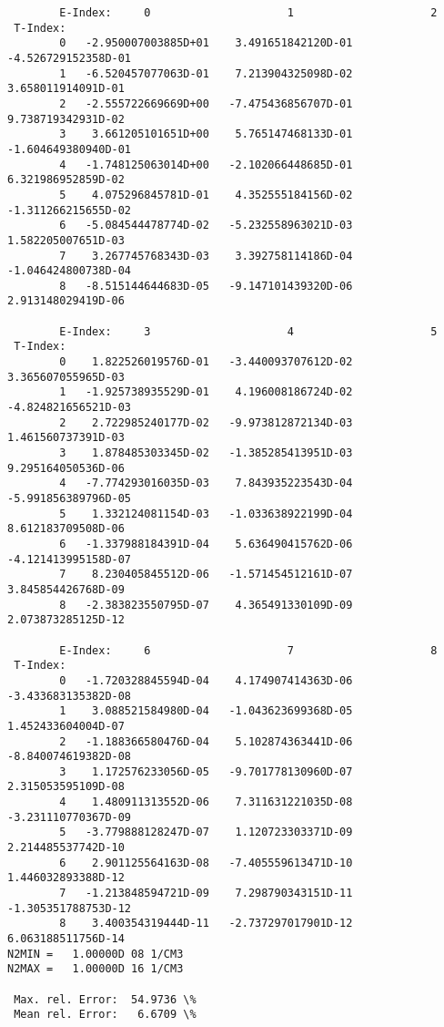 \documentclass[12pt,dvipdfmx]{article}
\begin{document}
{\begin{small}\begin{verbatim}
        E-Index:     0                     1                     2
 T-Index:
        0   -2.950007003885D+01    3.491651842120D-01   -4.526729152358D-01
        1   -6.520457077063D-01    7.213904325098D-02    3.658011914091D-01
        2   -2.555722669669D+00   -7.475436856707D-01    9.738719342931D-02
        3    3.661205101651D+00    5.765147468133D-01   -1.604649380940D-01
        4   -1.748125063014D+00   -2.102066448685D-01    6.321986952859D-02
        5    4.075296845781D-01    4.352555184156D-02   -1.311266215655D-02
        6   -5.084544478774D-02   -5.232558963021D-03    1.582205007651D-03
        7    3.267745768343D-03    3.392758114186D-04   -1.046424800738D-04
        8   -8.515144644683D-05   -9.147101439320D-06    2.913148029419D-06

        E-Index:     3                     4                     5
 T-Index:
        0    1.822526019576D-01   -3.440093707612D-02    3.365607055965D-03
        1   -1.925738935529D-01    4.196008186724D-02   -4.824821656521D-03
        2    2.722985240177D-02   -9.973812872134D-03    1.461560737391D-03
        3    1.878485303345D-02   -1.385285413951D-03    9.295164050536D-06
        4   -7.774293016035D-03    7.843935223543D-04   -5.991856389796D-05
        5    1.332124081154D-03   -1.033638922199D-04    8.612183709508D-06
        6   -1.337988184391D-04    5.636490415762D-06   -4.121413995158D-07
        7    8.230405845512D-06   -1.571454512161D-07    3.845854426768D-09
        8   -2.383823550795D-07    4.365491330109D-09    2.073873285125D-12

        E-Index:     6                     7                     8
 T-Index:
        0   -1.720328845594D-04    4.174907414363D-06   -3.433683135382D-08
        1    3.088521584980D-04   -1.043623699368D-05    1.452433604004D-07
        2   -1.188366580476D-04    5.102874363441D-06   -8.840074619382D-08
        3    1.172576233056D-05   -9.701778130960D-07    2.315053595109D-08
        4    1.480911313552D-06    7.311631221035D-08   -3.231110770367D-09
        5   -3.779888128247D-07    1.120723303371D-09    2.214485537742D-10
        6    2.901125564163D-08   -7.405559613471D-10    1.446032893388D-12
        7   -1.213848594721D-09    7.298790343151D-11   -1.305351788753D-12
        8    3.400354319444D-11   -2.737297017901D-12    6.063188511756D-14
N2MIN =   1.00000D 08 1/CM3
N2MAX =   1.00000D 16 1/CM3

 Max. rel. Error:  54.9736 \%
 Mean rel. Error:   6.6709 \%


\end{verbatim}
\end{small}}
\end{document}
